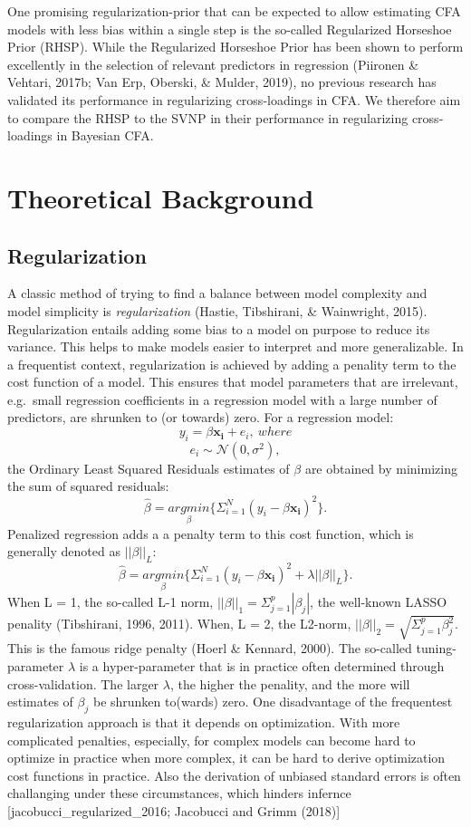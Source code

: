 \documentclass[
  english,
  man, donotrepeattitle,floatsintext]{apa6}
\begin{document}
One promising regularization-prior that can be expected to allow estimating CFA models with less bias within a single step is the so-called Regularized Horseshoe Prior (RHSP). While the Regularized Horseshoe Prior has been shown to perform excellently in the selection of relevant predictors in regression (Piironen \& Vehtari, 2017b; Van Erp, Oberski, \& Mulder, 2019), no previous research has validated its performance in regularizing cross-loadings in CFA. We therefore aim to compare the RHSP to the SVNP in their performance in regularizing cross-loadings in Bayesian CFA.

\hypertarget{theoretical-background}{%
\section{Theoretical Background}\label{theoretical-background}}

\hypertarget{regularization}{%
\subsection{Regularization}\label{regularization}}

A classic method of trying to find a balance between model complexity and model simplicity is \emph{regularization} (Hastie, Tibshirani, \& Wainwright, 2015). Regularization entails adding some bias to a model on purpose to reduce its variance. This helps to make models easier to interpret and more generalizable. In a frequentist context, regularization is achieved by adding a penality term to the cost function of a model. This ensures that model parameters that are irrelevant, e.g.~small regression coefficients in a regression model with a large number of predictors, are shrunken to (or towards) zero. For a regression model:
\[y_i = \beta \mathbf{x_i} + e_i, \ where \]
\[e_i \sim \mathcal{N}(0, \sigma^2), \]
the Ordinary Least Squared Residuals estimates of \(\beta\) are obtained by minimizing the sum of squared residuals:
\[ \hat{\beta} = \underset{\beta}{argmin} \{ \Sigma_{i=1}^N(y_i - \beta\mathbf{x_{i}} )^2 \}.\] Penalized regression adds a a penalty term to this cost function, which is generally denoted as \(||\beta||_L\):
\[ \hat{\beta} = \underset{\beta}{argmin} \{ \Sigma_{i=1}^N(y_i - \beta \mathbf{x_{i}} )^2 + \lambda ||\beta||_{L} \}.\]
When L = 1, the so-called L-1 norm, \(||\beta||_1 = \Sigma_{j=1}^p |\beta_j|\), the well-known LASSO penality (Tibshirani, 1996, 2011). When, L = 2, the L2-norm, \(||\beta||_2 = \sqrt{\Sigma_{j=1}^p \beta_j^2}\). This is the famous ridge penalty (Hoerl \& Kennard, 2000). The so-called tuning-parameter \(\lambda\) is a hyper-parameter that is in practice often determined through cross-validation. The larger \(\lambda\), the higher the penality, and the more will estimates of \(\beta_j\) be shrunken to(wards) zero. One disadvantage of the frequentest regularization approach is that it depends on optimization. With more complicated penalties, especially, for complex models can become hard to optimize in practice when more complex, it can be hard to derive optimization cost functions in practice. Also the derivation of unbiased standard errors is often challanging under these circumstances, which hinders infernce {[}jacobucci\_regularized\_2016; Jacobucci and Grimm (2018){]}
\end{document}
